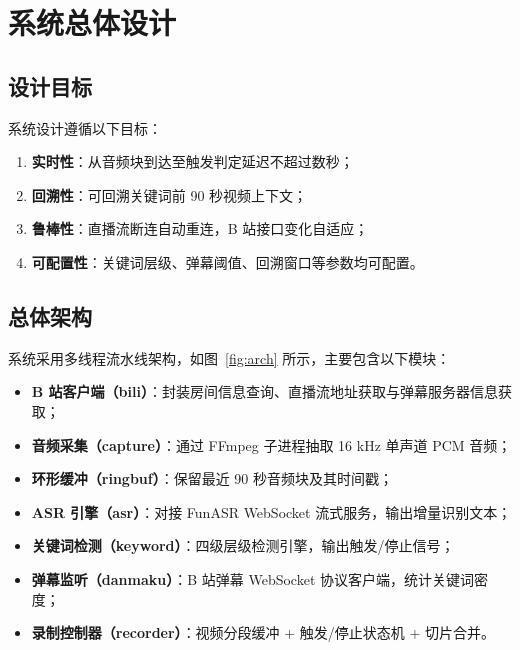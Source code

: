 \documentclass[UTF8,11pt,a4paper]{ctexart}
\begin{document}
\section{系统总体设计}

\subsection{设计目标}

系统设计遵循以下目标：

\begin{enumerate}
\item \textbf{实时性}：从音频块到达至触发判定延迟不超过数秒；
\item \textbf{回溯性}：可回溯关键词前 90 秒视频上下文；
\item \textbf{鲁棒性}：直播流断连自动重连，B 站接口变化自适应；
\item \textbf{可配置性}：关键词层级、弹幕阈值、回溯窗口等参数均可配置。
\end{enumerate}

\subsection{总体架构}

系统采用多线程流水线架构，如图~\ref{fig:arch} 所示，主要包含以下模块：

\begin{itemize}
\item \textbf{B 站客户端（bili）}：封装房间信息查询、直播流地址获取与弹幕服务器信息获取；
\item \textbf{音频采集（capture）}：通过 FFmpeg 子进程抽取 16 kHz 单声道 PCM 音频；
\item \textbf{环形缓冲（ringbuf）}：保留最近 90 秒音频块及其时间戳；
\item \textbf{ASR 引擎（asr）}：对接 FunASR WebSocket 流式服务，输出增量识别文本；
\item \textbf{关键词检测（keyword）}：四级层级检测引擎，输出触发/停止信号；
\item \textbf{弹幕监听（danmaku）}：B 站弹幕 WebSocket 协议客户端，统计关键词密度；
\item \textbf{录制控制器（recorder）}：视频分段缓冲 + 触发/停止状态机 + 切片合并。
\end{itemize}
\end{document}
